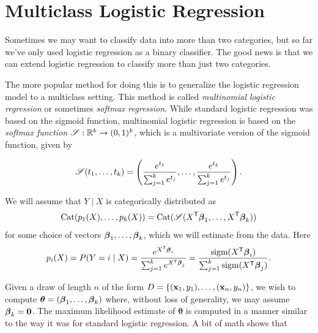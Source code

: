 \section*{Multiclass Logistic Regression}

Sometimes we may want to classify data into more than two categories, but so far we've only used logistic regression as a binary classifier.
The good news is that we can extend logistic regression to classify more than just two categories.

The more popular method for doing this is to generalize the logistic regression model to a multiclass setting.
This method is called \emph{multinomial logistic regression} or sometimes \emph{softmax regression}.
While standard logistic regression was based on the sigmoid function, multinomial logistic regression is based on the \emph{softmax function} $\mathscr{S}: \mathbb{R}^k \to (0,1)^k$, which is a multivariate version of the sigmoid function, given by

\begin{equation}
    \mathscr{S}(t_1,\dots,t_k) = \left(\frac{e^{t_1}}{\sum_{j=1}^k e^{t_j}}, \dots, \frac{e^{t_k}}{\sum_{j=1}^k e^{t_j}}\right).
\end{equation}

\noindent We will assume that $Y \mid X$ is categorically distributed as
\[
    \text{Cat}(p_1(X),\dots, p_k (X)) = \text{Cat}(\mathscr{S}(X^\mathsf{T} \boldsymbol\beta_1, \dots, X^\mathsf{T} \boldsymbol\beta_k))
\]
for some choice of vectors $\boldsymbol\beta_1,\dots, \boldsymbol\beta_k$, which we will estimate from the data.  Here
\[
p_i(X) = P(Y = i \mid X) = \frac{e^{X^\mathsf{T} \boldsymbol\beta_i}}{\sum_{j=1}^k e^{X^\mathsf{T} \boldsymbol\beta_j}} 
 = \frac{\text{sigm}(X^\mathsf{T} \boldsymbol\beta_i)}{\sum_{j=1}^k \text{sigm}(X^\mathsf{T} \boldsymbol\beta_j)}.
\]

Given a draw of length $n$ of the form $D = \{(\mathbf{x}_1,y_1),\dots, (\mathbf{x}_n,y_n)\}$, we wish to compute $\boldsymbol{\theta} = (\boldsymbol\beta_1,\dots, \boldsymbol\beta_k)$ where, without loss of generality, we may assume $\boldsymbol\beta_k=\boldsymbol{0}$.
The maximum likelihood estimate of $\boldsymbol{\theta}$ is computed in a manner similar to the way it was for standard logistic regression.
A bit of math shows that

